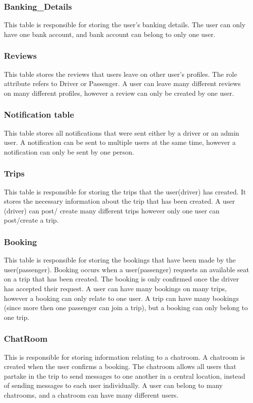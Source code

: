 \documentclass[hidelinks, 12pt, a4paper]{article}
\begin{document}
    \subsubsection{Banking\_Details}
       This table is responsible for storing the user’s banking details. The user can only have one bank account, and bank account can belong to only one user.
        
    \subsubsection{Reviews}
        This table stores the reviews that users leave on other user’s profiles. The role attribute refers to Driver or Passenger. A user can leave many different reviews on many different profiles, however a review can only be created by one user.
                
    
       \subsubsection{Notification table}
        This table stores all notifications that were sent either by a driver or an admin user. A notification can be sent to multiple users at the same time, however a notification can only be sent by one person.


       \subsubsection{Trips}
        This table is responsible for storing the trips that the user(driver) has created. It stores the necessary information about the trip that has been created. A user (driver) can post/ create many different trips however only one user can post/create a trip.
       
    
       \subsubsection{Booking}
        This table is responsible for storing the bookings that have been made by the user(passenger). Booking occurs when a user(passenger) requests an available seat on a trip that has been created. The booking is only confirmed once the driver has accepted their request. A user can have many bookings on many trips, however a booking can only relate to one user. A trip can have many bookings (since more then one passenger can join a trip), but a booking can only belong to one trip.
        
       \subsubsection{ChatRoom}
        This is responsible for storing information relating to a chatroom. A chatroom is created when the user confirms a booking. The chatroom allows all users that partake in the trip to send messages to one another in a central location, instead of sending messages to each user individually. A user can belong to many chatrooms, and a chatroom can have many different users.
\end{document}
